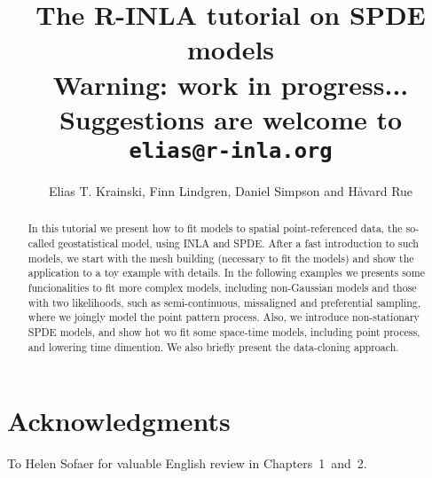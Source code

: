 \documentclass[a4paper,11pt]{report}
\title{\textbf{The R-INLA tutorial on SPDE models}\\
Warning: work in progress...\\
Suggestions are welcome to \texttt{elias@r-inla.org}}
\author{Elias T. Krainski, Finn Lindgren, Daniel Simpson and H{\aa}vard Rue}
\begin{document}
\maketitle

\begin{abstract}
  In this tutorial we present how to fit models 
  to spatial point-referenced data, the so-called 
  geostatistical model, using INLA and SPDE. 
  After a fast introduction to such models, 
  we start with the mesh building 
  (necessary to fit the models) and show the application 
  to a toy example with details. 
  In the following examples we presents some funcionalities 
  to fit more complex models, including non-Gaussian models 
  and those with two likelihoods, such as semi-continuous,  
  missaligned and preferential sampling, where we joingly model 
  the point pattern process. Also, we introduce 
  non-stationary SPDE models, and show hot wo fit 
  some space-time models, including point process, 
  and lowering time dimention. 
  We also briefly present the data-cloning approach.
\end{abstract} 

\section{Acknowledgments}
To Helen Sofaer for valuable English review in 
Chapters~1~and~2. 

 

\tableofcontents

 

 
 

 
 
 



 

 



\end{document}
